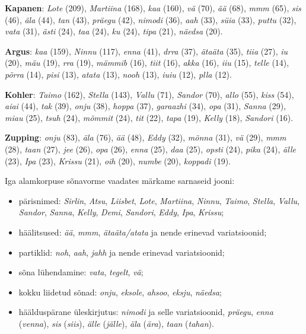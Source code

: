 \documentclass[12pt]{article}
\begin{document}
\textbf{Kapanen}: \emph{Lote} (209), \emph{Martiina} (168), \emph{kaa} (160), \emph{vä} (70), \emph{ää} (68), \emph{mmm} (65), \emph{sis} (46), \emph{äla} (44), \emph{tan} (43), \emph{präegu} (42), \emph{nimodi} (36), \emph{aah} (33), \emph{süia} (33), \emph{puttu} (32), \emph{vata} (31), \emph{ästi} (24), \emph{taa} (24), \emph{ku} (24), \emph{tipa} (21), \emph{näedsa} (20).

\textbf{Argus}: \emph{kaa} (159), \emph{Ninnu} (117), \emph{enna} (41), \emph{drra} (37), \emph{ätaäta} (35), \emph{tiia} (27), \emph{iu} (20), \emph{mäu} (19), \emph{rra} (19), \emph{mämmib} (16), \emph{tiit} (16), \emph{akka} (16), \emph{iiu} (15), \emph{telle} (14), \emph{põrra} (14), \emph{pisi} (13), \emph{atata} (13), \emph{nooh} (13), \emph{iuiu} (12), \emph{plla} (12).

\textbf{Kohler}: \emph{Taimo} (162), \emph{Stella} (143), \emph{Vallu} (71), \emph{Sandor} (70), \emph{allo} (55), \emph{kiss} (54), \emph{aiai} (44), \emph{tak} (39), \emph{onju} (38), \emph{hoppa} (37), \emph{garaazhi} (34), \emph{opa} (31), \emph{Sanna} (29), \emph{miau} (25), \emph{tsuh} (24), \emph{mõmmit} (24), \emph{tit} (22), \emph{tapa} (19), \emph{Kelly} (18), \emph{Sandori} (16).

\textbf{Zupping}: \emph{onju} (83), \emph{äla} (76), \emph{ää} (48), \emph{Eddy} (32), \emph{mõnna} (31), \emph{vä} (29), \emph{mmm} (28), \emph{taan} (27), \emph{jee} (26), \emph{opa} (26), \emph{enna} (25), \emph{daa} (25), \emph{opsti} (24), \emph{pika} (24), \emph{älle} (23), \emph{Ipa} (23), \emph{Krissu} (21), \emph{oih} (20), \emph{numbe} (20), \emph{koppadi} (19).

Iga alamkorpuse sõnavorme vaadates märkame sarnaseid jooni:

\begin{itemize}
    \item pärisnimed: \emph{Sirlin}, \emph{Atsu}, \emph{Liisbet}, \emph{Lote}, \emph{Martiina}, \emph{Ninnu}, \emph{Taimo}, \emph{Stella}, \emph{Vallu}, \emph{Sandor}, \emph{Sanna}, \emph{Kelly}, \emph{Demi}, \emph{Sandori}, \emph{Eddy}, \emph{Ipa}, \emph{Krissu};
    \item häälitsused: \emph{ää}, \emph{mmm}, \emph{ätaäta/atata} ja nende erinevad variatsioonid;
    \item partiklid: \emph{noh}, \emph{aah}, \emph{jahh} ja nende erinevad variatsioonid;
    \item sõna lühendamine: \emph{vata}, \emph{tegelt}, \emph{vä};
    \item kokku liidetud sõnad: \emph{onju}, \emph{eksole}, \emph{ahsoo}, \emph{eksju}, \emph{näedsa};
    \item häälduspärane üleskirjutus: \emph{nimodi} ja selle variatsioonid, \emph{präegu}, \emph{enna} (\emph{venna}), \emph{sis} (\emph{siis}), \emph{älle} (\emph{jälle}), \emph{äla} (\emph{ära}), \emph{taan} (\emph{tahan}).
\end{itemize}
\end{document}
